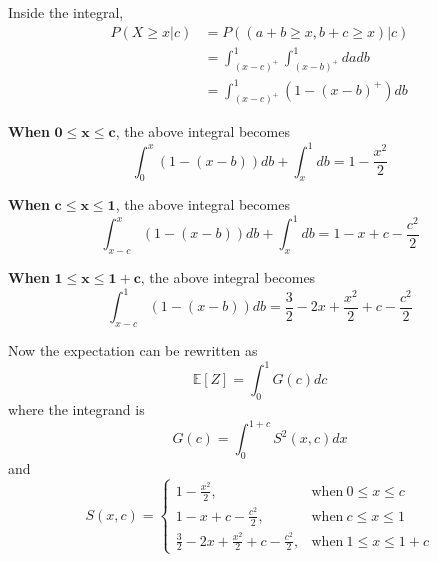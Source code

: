 \documentclass[12pt]{simple_doc}
\begin{document}
    Inside the integral,
    \begin{equation*}
        \begin{aligned}
        P(X \geqslant x | c) &= P((a + b \geqslant x, b + c \geqslant x)|c)\\
            &= \int_{(x-c)^+}^1 \int_{(x-b)^+}^1 da db\\
            &= \int_{(x-c)^+}^1 (1 - (x-b)^+) db
        \end{aligned}
    \end{equation*}

    \textbf{When} $\bm{0 \leqslant x \leqslant c}$, the above integral becomes
    \begin{equation*}
        \int_0^x (1 - (x-b)) db + \int_x^1 db = 1 - \frac{x^2}{2}
    \end{equation*}

    \textbf{When} $\bm{c \leqslant x \leqslant 1}$, the above integral becomes
    \begin{equation*}
        \int_{x-c}^x (1 - (x-b)) db + \int_x^1 db = 1 - x + c - \frac{c^2}{2}
    \end{equation*}

    \textbf{When} $\bm{1 \leqslant x \leqslant 1 + c}$, the above integral becomes
    \begin{equation*}
        \int_{x-c}^1 (1 - (x-b)) db = \frac{3}{2} - 2x + \frac{x^2}{2} + c - \frac{c^2}{2}
    \end{equation*}

    Now the expectation can be rewritten as
    \begin{equation*}
        \mathbb{E}[Z] = \int_0^1 G(c) dc
    \end{equation*}
    where the integrand is
    \begin{equation*}
        G(c) = \int_0^{1 + c} S^2(x, c) dx
    \end{equation*}
    and
    \begin{equation*}
        S(x, c) =
            \begin{cases}
              1 - \frac{x^2}{2}, & \text{when}\ 0 \leqslant x \leqslant c\\
              1 - x + c - \frac{c^2}{2}, & \text{when}\ c \leqslant x \leqslant 1\\
              \frac{3}{2} - 2x + \frac{x^2}{2} + c - \frac{c^2}{2}, & \text{when}\ 1 \leqslant x \leqslant 1 + c
            \end{cases}
    \end{equation*}
\end{document}
